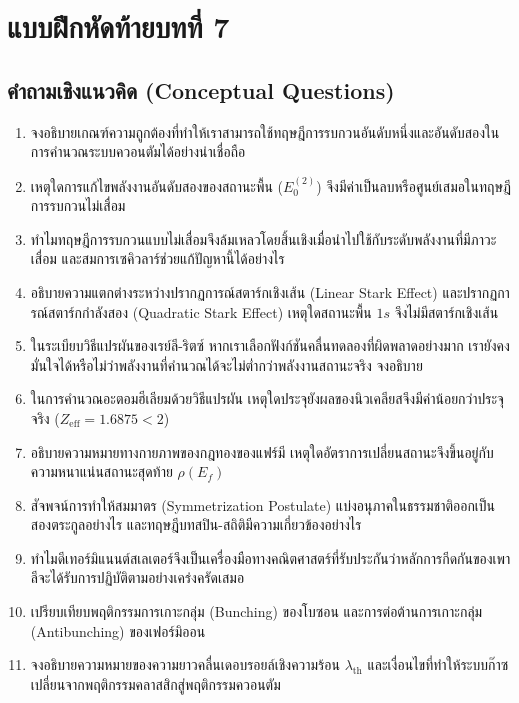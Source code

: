 \section*{แบบฝึกหัดท้ายบทที่ 7}

\subsection*{คำถามเชิงแนวคิด (Conceptual Questions)}

\begin{enumerate}[label=\textbf{\arabic*.}]
    \item จงอธิบายเกณฑ์ความถูกต้องที่ทำให้เราสามารถใช้ทฤษฎีการรบกวนอันดับหนึ่งและอันดับสองในการคำนวณระบบควอนตัมได้อย่างน่าเชื่อถือ
    \item เหตุใดการแก้ไขพลังงานอันดับสองของสถานะพื้น ($E_0^{(2)}$) จึงมีค่าเป็นลบหรือศูนย์เสมอในทฤษฎีการรบกวนไม่เสื่อม
    \item ทำไมทฤษฎีการรบกวนแบบไม่เสื่อมจึงล้มเหลวโดยสิ้นเชิงเมื่อนำไปใช้กับระดับพลังงานที่มีภาวะเสื่อม และสมการเซคิวลาร์ช่วยแก้ปัญหานี้ได้อย่างไร
    \item อธิบายความแตกต่างระหว่างปรากฏการณ์สตาร์กเชิงเส้น (Linear Stark Effect) และปรากฏการณ์สตาร์กกำลังสอง (Quadratic Stark Effect) เหตุใดสถานะพื้น $1s$ จึงไม่มีสตาร์กเชิงเส้น
    \item ในระเบียบวิธีแปรผันของเรย์ลี-ริตซ์ หากเราเลือกฟังก์ชันคลื่นทดลองที่ผิดพลาดอย่างมาก เรายังคงมั่นใจได้หรือไม่ว่าพลังงานที่คำนวณได้จะไม่ต่ำกว่าพลังงานสถานะจริง จงอธิบาย
    \item ในการคำนวณอะตอมฮีเลียมด้วยวิธีแปรผัน เหตุใดประจุยังผลของนิวเคลียสจึงมีค่าน้อยกว่าประจุจริง ($Z_{\text{eff}} = 1.6875 < 2$)
    \item อธิบายความหมายทางกายภาพของกฎทองของแฟร์มี เหตุใดอัตราการเปลี่ยนสถานะจึงขึ้นอยู่กับความหนาแน่นสถานะสุดท้าย $\rho(E_f)$
    \item สัจพจน์การทำให้สมมาตร (Symmetrization Postulate) แบ่งอนุภาคในธรรมชาติออกเป็นสองตระกูลอย่างไร และทฤษฎีบทสปิน-สถิติมีความเกี่ยวข้องอย่างไร
    \item ทำไมดีเทอร์มิแนนต์สเลเตอร์จึงเป็นเครื่องมือทางคณิตศาสตร์ที่รับประกันว่าหลักการกีดกันของเพาลีจะได้รับการปฏิบัติตามอย่างเคร่งครัดเสมอ
    \item เปรียบเทียบพฤติกรรมการเกาะกลุ่ม (Bunching) ของโบซอน และการต่อต้านการเกาะกลุ่ม (Antibunching) ของเฟอร์มิออน
    \item จงอธิบายความหมายของความยาวคลื่นเดอบรอยล์เชิงความร้อน $\lambda_{\text{th}}$ และเงื่อนไขที่ทำให้ระบบก๊าซเปลี่ยนจากพฤติกรรมคลาสสิกสู่พฤติกรรมควอนตัม

\end{enumerate}
